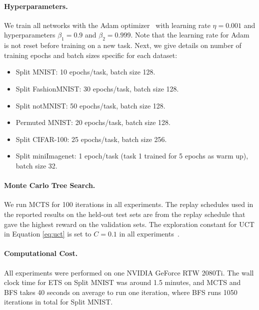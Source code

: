 \vspace{-3mm}
\paragraph{Hyperparameters.} We train all networks with the Adam optimizer~ with learning rate $\eta = 0.001$ and hyperparameters $\beta_1 = 0.9$ and $\beta_2 = 0.999$. Note that the learning rate for Adam is not reset before training on a new task. Next, we give details on number of training epochs and batch sizes specific for each dataset:
\begin{itemize}[topsep=1pt,noitemsep]
    \item Split MNIST: 10 epochs/task, batch size 128.
    \item Split FashionMNIST: 30 epochs/task, batch size 128.
    \item Split notMNIST: 50 epochs/task, batch size 128.
    \item Permuted MNIST: 20 epochs/task, batch size 128.
    \item Split CIFAR-100: 25 epochs/task, batch size 256.
    \item Split miniImagenet: 1 epoch/task (task 1 trained for 5 epochs as warm up), batch size 32.
\end{itemize}

\vspace{-3mm}
\paragraph{Monte Carlo Tree Search.} We run MCTS for 100 iterations in all experiments. The replay schedules used in the reported results on the held-out test sets are from the replay schedule that gave the highest reward on the validation sets. The exploration constant for UCT in Equation \ref{eq:uct} is set to $C=0.1$ in all experiments~.

\vspace{-3mm}
\paragraph{Computational Cost.} All experiments were performed on one NVIDIA GeForce RTW 2080Ti. The wall clock time for ETS on Split MNIST was around 1.5 minutes, and MCTS and BFS takes 40 seconds on average to run one iteration, where BFS runs 1050 iterations in total for Split MNIST. 


\vspace{-3mm}
